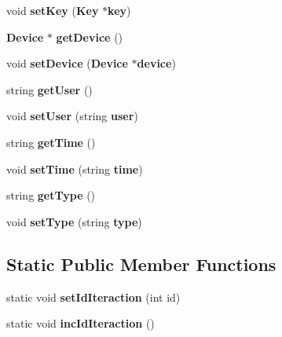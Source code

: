 \begin{CompactItemize}
\item 
void \textbf{setKey} ({\bf Key} $\ast${\bf key})\label{classbr_1_1ufscar_1_1lince_1_1ginga_1_1recommender_1_1Iteraction_513718c73541adcb39df87d73cb71f1f}

\item 
{\bf Device} $\ast$ \textbf{getDevice} ()\label{classbr_1_1ufscar_1_1lince_1_1ginga_1_1recommender_1_1Iteraction_7f0e10e4921a1011970b4a1f0ae71329}

\item 
void \textbf{setDevice} ({\bf Device} $\ast${\bf device})\label{classbr_1_1ufscar_1_1lince_1_1ginga_1_1recommender_1_1Iteraction_5e0c28208110138e2f94361720e5f82e}

\item 
string \textbf{getUser} ()\label{classbr_1_1ufscar_1_1lince_1_1ginga_1_1recommender_1_1Iteraction_1274ab4e4f6be00e1279466eb8b1cc6f}

\item 
void \textbf{setUser} (string {\bf user})\label{classbr_1_1ufscar_1_1lince_1_1ginga_1_1recommender_1_1Iteraction_4e5a3e56b0b980c92b64e5ea216ae461}

\item 
string \textbf{getTime} ()\label{classbr_1_1ufscar_1_1lince_1_1ginga_1_1recommender_1_1Iteraction_4913b5d6d98757fe7a98730bf204dc90}

\item 
void \textbf{setTime} (string {\bf time})\label{classbr_1_1ufscar_1_1lince_1_1ginga_1_1recommender_1_1Iteraction_a913ee56644e379b7f5726432cf2e78f}

\item 
string \textbf{getType} ()\label{classbr_1_1ufscar_1_1lince_1_1ginga_1_1recommender_1_1Iteraction_eeccf2c5d2bcb819ece9be283400bb5a}

\item 
void \textbf{setType} (string {\bf type})\label{classbr_1_1ufscar_1_1lince_1_1ginga_1_1recommender_1_1Iteraction_6c8668b56bcc1b65b9e93f89b6b0b00f}

\end{CompactItemize}
\subsection*{Static Public Member Functions}
\begin{CompactItemize}
\item 
static void \textbf{setIdIteraction} (int id)\label{classbr_1_1ufscar_1_1lince_1_1ginga_1_1recommender_1_1Iteraction_7566c95496ff50b8c84052233056764d}

\item 
static void \textbf{incIdIteraction} ()\label{classbr_1_1ufscar_1_1lince_1_1ginga_1_1recommender_1_1Iteraction_dd2c9a50d1c79f198d79d131e0173529}

\end{CompactItemize}
